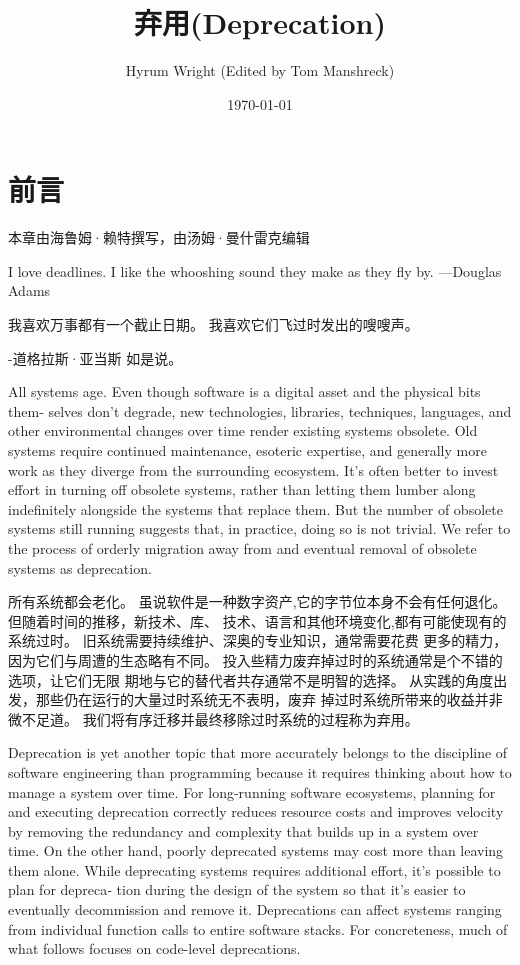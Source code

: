 \documentclass[10pt,a4paper,UTF8]{ctexart}
\author{Hyrum Wright (Edited by Tom Manshreck)}
\date{\today}
\title{弃用(Deprecation)}
\begin{document}
\maketitle
\tableofcontents


\section{前言}
\label{sec:org097e93a}

本章由海鲁姆·赖特撰写，由汤姆·曼什雷克编辑

I love deadlines. I like the whooshing sound they make as they fly by.  —Douglas Adams

我喜欢万事都有一个截止日期。 我喜欢它们飞过时发出的嗖嗖声。

-道格拉斯·亚当斯 如是说。

All systems age. Even though software is a digital asset and the physical bits them‐ selves don’t
degrade, new technologies, libraries, techniques, languages, and other environmental changes over
time render existing systems obsolete. Old systems require continued maintenance, esoteric
expertise, and generally more work as they diverge from the surrounding ecosystem. It’s often better
to invest effort in turning off obsolete systems, rather than letting them lumber along indefinitely
alongside the systems that replace them. But the number of obsolete systems still running suggests
that, in practice, doing so is not trivial. We refer to the process of orderly migration away from
and eventual removal of obsolete systems as deprecation.

所有系统都会老化。 虽说软件是一种数字资产,它的字节位本身不会有任何退化。但随着时间的推移，新技术、库、
技术、语言和其他环境变化,都有可能使现有的系统过时。 旧系统需要持续维护、深奥的专业知识，通常需要花费
更多的精力，因为它们与周遭的生态略有不同。 投入些精力废弃掉过时的系统通常是个不错的选项，让它们无限
期地与它的替代者共存通常不是明智的选择。 从实践的角度出发，那些仍在运行的大量过时系统无不表明，废弃
掉过时系统所带来的收益并非微不足道。 我们将有序迁移并最终移除过时系统的过程称为弃用。


Deprecation is yet another topic that more accurately belongs to the discipline of software
engineering than programming because it requires thinking about how to manage a system over time.
For long-running software ecosystems, planning for and executing deprecation correctly reduces
resource costs and improves velocity by removing the redundancy and complexity that builds up in a
system over time. On the other hand, poorly deprecated systems may cost more than leaving them
alone. While deprecating systems requires additional effort, it’s possible to plan for depreca‐ tion
during the design of the system so that it’s easier to eventually decommission and remove it.
Deprecations can affect systems ranging from individual function calls to entire software stacks.
For concreteness, much of what follows focuses on code-level deprecations.
\end{document}
